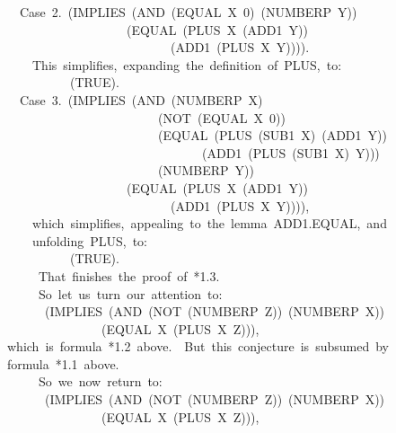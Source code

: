 \documentclass[11pt]{book}
\newenvironment{pubasis}{\begin{flushleft}\ttfamily\small}{\normalsize\rmfamily\end{flushleft}}
\begin{document}
\begin{pubasis}
~~Case~2.~(IMPLIES~(AND~(EQUAL~X~0)~(NUMBERP~Y))\\
~~~~~~~~~~~~~~~~~~~(EQUAL~(PLUS~X~(ADD1~Y))\\
~~~~~~~~~~~~~~~~~~~~~~~~~~(ADD1~(PLUS~X~Y)))).\\

~~~~This~simplifies,~expanding~the~definition~of~PLUS,~to:\\

~~~~~~~~~~(TRUE).\\

~~Case~3.~(IMPLIES~(AND~(NUMBERP~X)\\
~~~~~~~~~~~~~~~~~~~~~~~~(NOT~(EQUAL~X~0))\\
~~~~~~~~~~~~~~~~~~~~~~~~(EQUAL~(PLUS~(SUB1~X)~(ADD1~Y))\\
~~~~~~~~~~~~~~~~~~~~~~~~~~~~~~~(ADD1~(PLUS~(SUB1~X)~Y)))\\
~~~~~~~~~~~~~~~~~~~~~~~~(NUMBERP~Y))\\
~~~~~~~~~~~~~~~~~~~(EQUAL~(PLUS~X~(ADD1~Y))\\
~~~~~~~~~~~~~~~~~~~~~~~~~~(ADD1~(PLUS~X~Y)))),\\

~~~~which~simplifies,~appealing~to~the~lemma~ADD1.EQUAL,~and\\
~~~~unfolding~PLUS,~to:\\

~~~~~~~~~~(TRUE).\\

~~~~~That~finishes~the~proof~of~*1.3.\\

~~~~~So~let~us~turn~our~attention~to:\\

~~~~~~(IMPLIES~(AND~(NOT~(NUMBERP~Z))~(NUMBERP~X))\\
~~~~~~~~~~~~~~~(EQUAL~X~(PLUS~X~Z))),\\

which~is~formula~*1.2~above.~~But~this~conjecture~is~subsumed~by\\
formula~*1.1~above.\\

~~~~~So~we~now~return~to:\\

~~~~~~(IMPLIES~(AND~(NOT~(NUMBERP~Z))~(NUMBERP~X))\\
~~~~~~~~~~~~~~~(EQUAL~X~(PLUS~X~Z))),\\


\end{pubasis}
\end{document}
